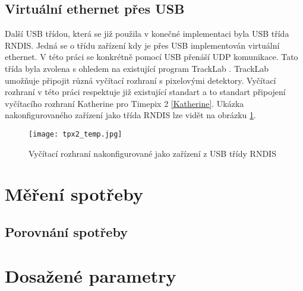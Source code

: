 \subsection{Virtuální ethernet přes USB}
	Další USB třídou, která se již použila v konečné implementaci byla USB třída RNDIS. Jedná se o třídu zařízení kdy je přes USB implementován virtuální ethernet. V této práci se konkrétně pomocí USB přenáší UDP komunikace. Tato třída byla zvolena s ohledem na existující program TrackLab \cite{TrackLab}. TrackLab umožňuje připojit různá vyčítací rozhraní s pixelovými detektory. Vyčítací rozhraní v této práci respektuje již existující standart a to standart připojení vyčítacího rozhraní Katherine pro Timepix 2 \ref{Katherine}. Ukázka nakonfigurovaného zařízení jako třída RNDIS lze vidět na obrázku \ref{fig:RNDIS}.
	\begin{figure}[h!]
		\centering
		\captionsetup{justification=centering}
		\texttt{[image: tpx2\_temp.jpg]}
		\caption{Vyčítací rozhraní nakonfigurované jako zařízení z USB třídy RNDIS} 
		\label{fig:RNDIS}
	\end{figure}
	

\section{Měření spotřeby}
	\subsection{Porovnání spotřeby} %
	
\section{Dosažené parametry}
